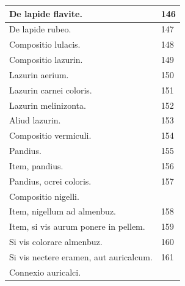 \documentclass[a4paper, 11pt, oneside, polutonikogreek, italian]{article}
\begin{document}
\begin{center}
\begin{longtable}{|p{60mm}|l|}
         De lapide flavite.                                                              & 146 \\ \hline
         De lapide rubeo.                                                                & 147 \\ \hline
         Compositio lulacis.                                                             & 148 \\ \hline
         Compositio lazurin.                                                             & 149 \\ \hline
         Lazurin aerium.                                                                 & 150 \\ \hline
         Lazurin carnei coloris.                                                         & 151 \\ \hline
         Lazurin melinizonta.                                                            & 152 \\ \hline
         Aliud lazurin.                                                                  & 153 \\ \hline
         Compositio vermiculi.                                                           & 154 \\ \hline
         Pandius.                                                                        & 155 \\ \hline
         Item, pandius.                                                                  & 156 \\ \hline
         Pandius, ocrei coloris.                                                         & 157 \\ \hline
         Compositio nigelli.                                                             & ~ \\ \hline
         Item, nigellum ad almenbuz.                                                     & 158 \\ \hline
         Item, si vis aurum ponere in pellem.                                            & 159 \\ \hline
         Si vis colorare almenbuz.                                                       & 160 \\ \hline
         Si vis nectere eramen, aut auricalcum.                                          & 161 \\ \hline
         Connexio auricalci.                                                             & ~ \\ \hline

\end{longtable}
\end{center}
\end{document}
